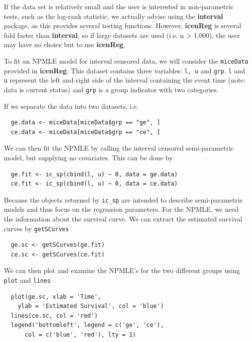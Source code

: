 \documentclass[11pt]{report}
\begin{document}
  If the data set is relatively small and the user is interested in non-parametric tests,
  such as the log-rank statistic, we actually advise using the {\bf interval} package,
  as this provides several testing functions. However, {\bf icenReg} is several fold 
  faster than {\bf interval}, so if large datasets are used (i.e. n > 1,000), the user
  may have no choice but to use {\bf icenReg}.
  
  To fit an NPMLE model for interval censored data, we will consider the \texttt{miceData}
  provided in {\bf icenReg}. This dataset contains three variables: \texttt{l, u} and
  \texttt{grp}. \texttt{l} and \texttt{u} represent the left and right side of the interval
  containing the event time (note: data is current status) and \texttt{grp} is a group
  indicator with two categories.
  
  If we separate the data into two datasets, i.e. 
  
  \begin{verbatim}
  ge.data <- miceData[miceData$grp == "ge", ]
  ce.data <- miceData[miceData$grp == "ce", ]
  \end{verbatim}

  We can then fit the NPMLE by calling the interval censored semi-parametric model, 
  but supplying no covariates. This can be done by 
  
  \begin{verbatim}
  ge.fit <- ic_sp(cbind(l, u) ~ 0, data = ge.data)
  ce.fit <- ic_sp(cbind(l, u) ~ 0, data = ce.data)
  \end{verbatim}

  Because the objects returned by \texttt{ic\_sp} are intended
  to describe semi-parametric models and thus focus on the 
  regression parameters. For the NPMLE, we need the information
  about the survival curve. 
  We can extract the estimated survival curves by \texttt{getSCurves}
  
  \begin{verbatim}
  ge.sc <- getSCurves(ge.fit)
  ce.sc <- getSCurves(ce.fit)
  \end{verbatim}

  We can then plot and examine the NPMLE's for the two different groups
  using \texttt{plot} and \texttt{lines}
  
  \begin{verbatim}
  plot(ge.sc, xlab = 'Time', 
    ylab = 'Estimated Survival', col = 'blue')
  lines(ce.sc, col = 'red')
  legend('bottomleft', legend = c('ge', 'ce'), 
      col = c('blue', 'red'), lty = 1)
  \end{verbatim}
\end{document}
